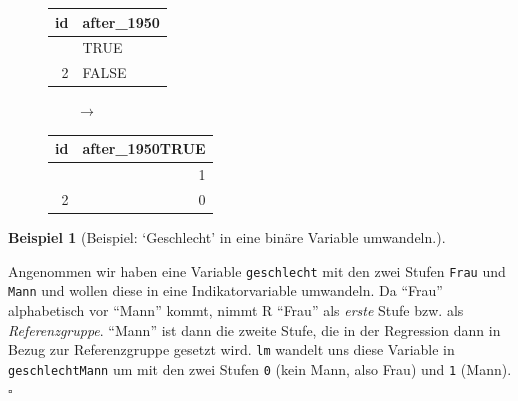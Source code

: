 \documentclass[
  a4paper,
]{scrbook}
\theoremstyle{definition}
\newtheorem{example}{Beispiel}[chapter]
\theoremstyle{definition}
\theoremstyle{definition}
\theoremstyle{remark}
\begin{document}
\begin{figure}

\begin{minipage}{0.40\linewidth}

\begin{longtable}[]{@{}rl@{}}
\toprule\noalign{}
id & after\_1950 \\
\midrule\noalign{}
\endhead
\bottomrule\noalign{}
\endlastfoot
1 & TRUE \\
2 & FALSE \\
\end{longtable}

\end{minipage}%
%
\begin{minipage}{0.20\linewidth}
\(\qquad \rightarrow\)\end{minipage}%
%
\begin{minipage}{0.40\linewidth}

\begin{longtable}[]{@{}rr@{}}
\toprule\noalign{}
id & after\_1950TRUE \\
\midrule\noalign{}
\endhead
\bottomrule\noalign{}
\endlastfoot
1 & 1 \\
2 & 0 \\
\end{longtable}

\end{minipage}%

\end{figure}%

\begin{example}[Beispiel: `Geschlecht' in eine binäre Variable
umwandeln.]\protect\hypertarget{exm-bin-trans}{}\label{exm-bin-trans}

Angenommen wir haben eine Variable \texttt{geschlecht} mit den zwei
Stufen \texttt{Frau} und \texttt{Mann} und wollen diese in eine
Indikatorvariable umwandeln. Da ``Frau'' alphabetisch vor ``Mann''
kommt, nimmt R ``Frau'' als \emph{erste} Stufe bzw. als
\emph{Referenzgruppe}. ``Mann'' ist dann die zweite Stufe, die in der
Regression dann in Bezug zur Referenzgruppe gesetzt wird. \texttt{lm}
wandelt uns diese Variable in \texttt{geschlechtMann} um mit den zwei
Stufen \texttt{0} (kein Mann, also Frau) und \texttt{1}
(Mann).\(\square\)

\end{example}
\end{document}
